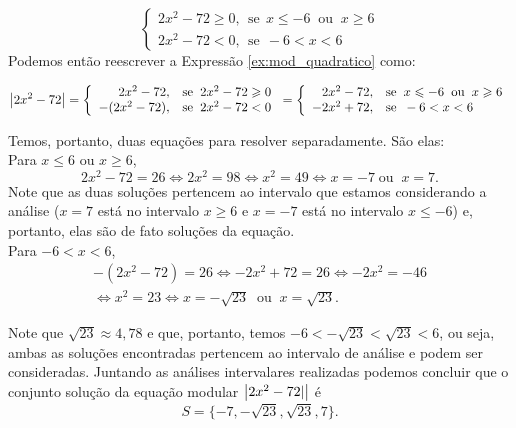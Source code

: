 \begin{exem}
     \[
     \begin{cases}
      2x^2- 72 \geq 0, \ \ \text{se} \ \ x \leq -6 \; \; \mbox{ou} \; \; x \geq 6\\
      2x^2- 72 < 0, \ \ \text{se} \ \ -6 < x < 6
      \end{cases}
     \]
Podemos então reescrever a Expressão \ref{ex:mod_quadratico} como:

\begin{equation}
\left|2x^2 - 72\right| = \left\{\begin{array}{rl}
2x^2 - 72, & \mbox{se} \; \;  2x^2 - 72 \geqslant 0\\
-(2x^2 - 72), & \mbox{se} \; \; 2x^2 - 72 < 0
\end{array}\right. = \left\{\begin{array}{rl}
2x^2 - 72, & \mbox{se} \; \;  x \leqslant -6 \; \; \mbox{ou} \; \; x \geqslant 6\\
-2x^2 + 72, & \mbox{se} \; \; -6 < x < 6
\end{array}\right. \end{equation}

Temos, portanto, duas equações para resolver separadamente. São elas:\\

Para $x\leq 6$ ou $x \geq 6$,
\begin{equation*}
2x^2- 72= 26 \Leftrightarrow 2x^2= 98 \Leftrightarrow x^2= 49 \Leftrightarrow x= - 7\; \mbox{ou} \; \; x = 7.
\end{equation*}
     Note que as duas soluções pertencem ao intervalo que estamos considerando a análise ($x = 7$ está no intervalo $x \geq 6$ e $x = -7$ está no intervalo $x\leq -6$) e, portanto, elas são de fato soluções da equação.\\

Para $-6 < x < 6$,
      \begin{eqnarray*}
      -(2x^2-72)= 26 \Leftrightarrow -2x^2 + 72= 26 \Leftrightarrow -2x^2= -46 \\
     \Leftrightarrow x^2= 23 \Leftrightarrow x= -\sqrt{23} \; \; \mbox{ou} \; \;  x = \sqrt{23}.
      \end{eqnarray*}

Note que $\sqrt{23} \approx 4,78$ e que, portanto, temos $-6 < -\sqrt{23} < \sqrt{23} < 6$, ou seja, ambas as soluções encontradas pertencem ao intervalo de análise e podem ser consideradas. Juntando as análises intervalares realizadas podemos concluir que o conjunto solução da equação modular $\left|2x^2 - 72|\right|$ é 
\begin{equation*}
S= \{-7, -\sqrt{23}, \sqrt{23}, 7\}.
\end{equation*}
\end{exem}

